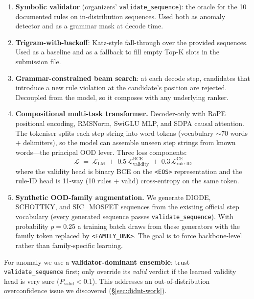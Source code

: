 \documentclass[11pt,a4paper]{article}
\begin{document}
\begin{enumerate}[leftmargin=*,itemsep=2pt]
\item \textbf{Symbolic validator} (organizers' \texttt{validate\_sequence}): the oracle for the 10 documented rules on in-distribution sequences. Used both as anomaly detector and as a grammar mask at decode time.

\item \textbf{Trigram-with-backoff}: Katz-style fall-through over the provided sequences. Used as a baseline and as a fallback to fill empty Top-K slots in the submission file.

\item \textbf{Grammar-constrained beam search}: at each decode step, candidates that introduce a new rule violation at the candidate's position are rejected. Decoupled from the model, so it composes with any underlying ranker.

\item \textbf{Compositional multi-task transformer.} Decoder-only with RoPE positional encoding, RMSNorm, SwiGLU MLP, and SDPA causal attention. The tokeniser splits each step string into word tokens (vocabulary $\sim$70 words + delimiters), so the model can assemble unseen step strings from known words---the principal OOD lever. Three loss components:
\begin{equation*}
\mathcal{L} \;=\; \mathcal{L}_{\text{LM}} \;+\; 0.5\,\mathcal{L}_{\text{validity}}^{\text{BCE}} \;+\; 0.3\,\mathcal{L}_{\text{rule-ID}}^{\text{CE}}
\end{equation*}
where the validity head is binary BCE on the \texttt{<EOS>} representation and the rule-ID head is 11-way (10 rules + valid) cross-entropy on the same token.

\item \textbf{Synthetic OOD-family augmentation.} We generate DIODE, SCHOTTKY, and SIC\_MOSFET sequences from the existing official step vocabulary (every generated sequence passes \texttt{validate\_sequence}). With probability $p{=}0.25$ a training batch draws from these generators with the family token replaced by \texttt{<FAMILY\_UNK>}. The goal is to force backbone-level rather than family-specific learning.
\end{enumerate}

For anomaly we use a \textbf{validator-dominant ensemble}: trust \texttt{validate\_sequence} first; only override its \emph{valid} verdict if the learned validity head is very sure ($P_\text{valid} < 0.1$). This addresses an out-of-distribution overconfidence issue we discovered (\S\ref{sec:didnt-work}).
\end{document}
